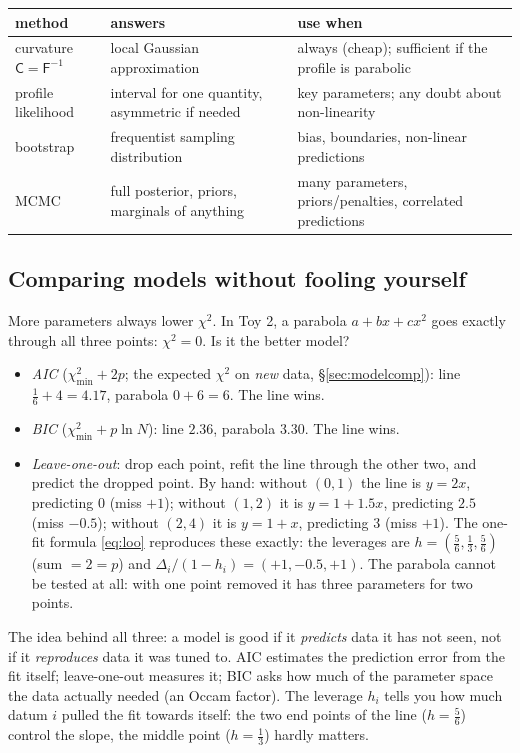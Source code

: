 \documentclass[11pt,a4paper]{article}
\numberwithin{equation}{section}
\theoremstyle{definition}
\theoremstyle{plain}
\theoremstyle{remark}
\numberwithin{algorithm}{section}
\newcommand{\sF}{\mathsf F}
\newcommand{\sC}{\mathsf C}
\begin{document}
\begin{center}\small
\begin{tabular}{@{}p{3.0cm}p{5.6cm}p{6.2cm}@{}}\toprule
method & answers & use when\\\midrule
curvature $\sC=\sF^{-1}$ & local Gaussian approximation & always (cheap); sufficient if the profile is parabolic\\
profile likelihood & interval for one quantity, asymmetric if needed & key parameters; any doubt about non-linearity\\
bootstrap & frequentist sampling distribution & bias, boundaries, non-linear predictions\\
MCMC & full posterior, priors, marginals of anything & many parameters, priors/penalties, correlated predictions\\\bottomrule
\end{tabular}
\end{center}

\subsection{Comparing models without fooling yourself}\label{sec:pr-compare}
More parameters always lower $\chi^2$. In Toy 2, a parabola $a+bx+cx^2$ goes exactly through all three points: $\chi^2=0$. Is it the better model?
\begin{itemize}[leftmargin=1.3em,itemsep=3pt]
\item \emph{AIC} ($\chi^2_{\min}+2p$; the expected $\chi^2$ on \emph{new} data, \S\ref{sec:modelcomp}): line $\frac16+4=4.17$, parabola $0+6=6$. The line wins.
\item \emph{BIC} ($\chi^2_{\min}+p\ln N$): line $2.36$, parabola $3.30$. The line wins.
\item \emph{Leave-one-out}: drop each point, refit the line through the other two, and predict the dropped point. By hand: without $(0,1)$ the line is $y=2x$, predicting $0$ (miss $+1$); without $(1,2)$ it is $y=1+1.5x$, predicting $2.5$ (miss $-0.5$); without $(2,4)$ it is $y=1+x$, predicting $3$ (miss $+1$). The one-fit formula \eqref{eq:loo} reproduces these exactly: the leverages are $h=(\frac56,\frac13,\frac56)$ (sum $=2=p$) and $\Delta_i/(1-h_i)=(+1,-0.5,+1)$. The parabola cannot be tested at all: with one point removed it has three parameters for two points.
\end{itemize}
The idea behind all three: a model is good if it \emph{predicts} data it has not seen, not if it \emph{reproduces} data it was tuned to. AIC estimates the prediction error from the fit itself; leave-one-out measures it; BIC asks how much of the parameter space the data actually needed (an Occam factor). The leverage $h_i$ tells you how much datum $i$ pulled the fit towards itself: the two end points of the line ($h=\frac56$) control the slope, the middle point ($h=\frac13$) hardly matters.
\end{document}
